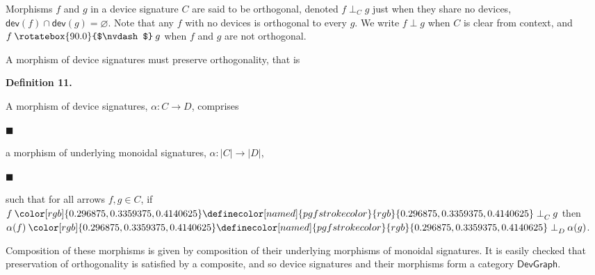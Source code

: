 \documentclass[10pt,a4paper]{article}
\begin{document}
 
Morphisms $f$ and $g$ in a device signature $C$ are said to be orthogonal, denoted $f\perp_{C}g$ just when they share no devices, $\mathsf{dev}(f)\cap\mathsf{dev}(g)=\varnothing$. Note that any $f$ with no devices is orthogonal to every $g$. We write $f\perp g$ when $C$ is clear from context, and $f\mathbin{\rotatebox{90.0}{$\nvdash$}}g$ when $f$ and $g$ are not orthogonal.\par
 
 
 
 
A morphism of device signatures must preserve orthogonality, that is\par
 
 
 
\par\medskip\noindent\textbf{Definition 11.}\par
 
 
A morphism of device signatures, $\alpha:C\to D$, comprises\par
  
\par\noindent  $\blacksquare$ 
 
a morphism of underlying monoidal signatures, $\alpha:|C|\to|D|$,\par
 
 
 
\par\noindent  $\blacksquare$ 
 
such that for all arrows $f,g\in C$, if $f\mathbin{{\color[rgb]{0.296875,0.3359375,0.4140625}\definecolor[named]{pgfstrokecolor}{rgb}{0.296875,0.3359375,0.4140625}\perp}_{C}}g$ then $\alpha(f)\mathbin{{\color[rgb]{0.296875,0.3359375,0.4140625}\definecolor[named]{pgfstrokecolor}{rgb}{0.296875,0.3359375,0.4140625}\perp}_{D}}\alpha(g)$.\par
 
 
  
 
 
 
Composition of these morphisms is given by composition of their underlying morphisms of monoidal signatures. It is easily checked that preservation of orthogonality is satisfied by a composite, and so device signatures and their morphisms form a category $\mathsf{DevGraph}$.\par
 
\end{document}
